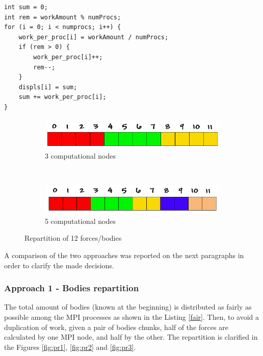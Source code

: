 \documentclass[a4paper]{article}
\begin{document}
\begin{lstlisting}[label=fair, caption=fair distribution of work]
int sum = 0;
int rem = workAmount % numProcs; 
for (i = 0; i < numprocs; i++) {
    work_per_proc[i] = workAmount / numProcs;
    if (rem > 0) {
        work_per_proc[i]++;
        rem--;
    }
    displs[i] = sum;
    sum += work_per_proc[i];
}
\end{lstlisting}
\FloatBarrier

\begin{figure}[!ht]
    \centering
    \begin{subfigure}[b]{0.5\textwidth}
        \centering
        \includegraphics[width=1\linewidth]{array_procs_3}
        \caption{3 computational nodes}
        \label{fig:repa1}
    \end{subfigure}%
    ~ 
    \begin{subfigure}[b]{0.5\textwidth}
        \centering
        \includegraphics[width=1\linewidth]{array_procs_5}
        \caption{5 computational nodes}
        \label{fig:repa2}
    \end{subfigure}
    \caption{Repartition of 12 forces/bodies}
    \label{fig:repa}
    	
\end{figure}
\FloatBarrier

A comparison of the two approaches was reported on the next paragraphs in order to clarify the made decisions.

\subsubsection{Approach 1 - Bodies repartition}
\label{sec:a1}

The total amount of bodies (known at the beginning) is distributed as fairly as possible among the  MPI processes as shown in the Listing \ref{fair}. Then, to avoid a duplication of work, given a pair of bodies chunks, half of the forces are calculated by one MPI node, and half by the other. The repartition is clarified in the Figures \ref{fig:pr1}, \ref{fig:pr2} and \ref{fig:pr3}.
\end{document}
